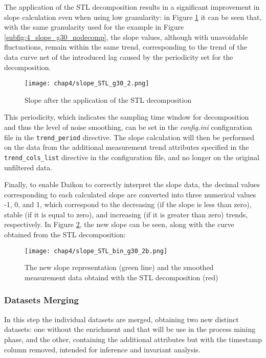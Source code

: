 The application of the STL decomposition results in a significant improvement in slope calculation even when using low granularity: in Figure \ref{fig:4_STL_decomp_results} it can be seen that, with the same granularity used for the example in Figure \ref{subfig:4_slope_g30_nodecomp}, the slope values, although with unavoidable fluctuations, remain within the same trend, corresponding to the trend of the data curve net of the introduced lag caused by the periodicity set for the decomposition.

\begin{figure}[ht]
	\centering
	\texttt{[image: chap4/slope\_STL\_g30\_2.png]}
	\caption{Slope after the application of the STL decomposition}
	\label{fig:4_STL_decomp_results}
\end{figure}
This periodicity, which indicates the sampling time window for decomposition and thus the level of noise smoothing, can be set in the \textit{config.ini} configuration file in the \texttt{trend\_period} directive.\newline
The slope calculation will then be performed on the data from the additional measurement trend attributes specified in the \texttt{trend\_cols\_list} directive in the configuration file, and no longer on the original unfiltered data.

\bigskip
Finally, to enable Daikon to correctly interpret the slope data, the decimal values corresponding to each calculated slope are converted into three numerical values -1, 0, and 1, which correspond to the decreasing (if the slope is less than zero), stable (if it is equal to zero), and increasing (if it is greater than zero) trends, respectively. In Figure \ref{fig:4_slope_daikon}, the new slope can be seen, along with the curve obtained from the STL decomposition:

\begin{figure}[ht]
	\centering
	\texttt{[image: chap4/slope\_STL\_bin\_g30\_2b.png]}
	\caption{The new slope representation (green line) and the smoothed measurement data obtaind with the STL decomposition (red)}
	\label{fig:4_slope_daikon}
\end{figure}

\subsubsection{Datasets Merging}
\label{subsubsec:4_dataset_merging}
In this step the individual datasets are merged, obtaining two new distinct datasets: one without the enrichment and that will be use in the process mining phase, and the other, containing the additional attributes but with the timestamp column removed, intended for inference and invariant analysis.

